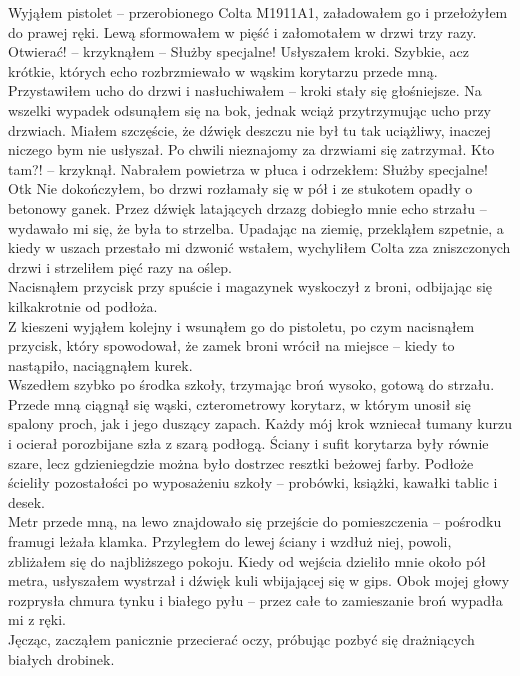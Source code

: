 \documentclass[../MAIN.tex]{subfiles}
\begin{document}
Wyjąłem pistolet -- przerobionego Colta M1911A1, załadowałem go i przełożyłem do prawej ręki. Lewą sformowałem w pięść i załomotałem w drzwi trzy razy.
%
\sx Otwierać! -- krzyknąłem -- Służby specjalne!
\qd
Usłyszałem kroki. Szybkie, acz krótkie, których echo rozbrzmiewało w wąskim korytarzu przede mną.
Przystawiłem ucho do drzwi i nasłuchiwałem -- kroki stały się głośniejsze. Na wszelki wypadek odsunąłem się na bok, jednak wciąż przytrzymując ucho przy drzwiach. Miałem szczęście, że dźwięk deszczu nie był tu tak uciążliwy, inaczej niczego bym nie usłyszał. Po chwili nieznajomy za drzwiami się zatrzymał.
%
\sx Kto tam?! -- krzyknął.
\qd
Nabrałem powietrza w płuca i odrzekłem:
%
\sx Służby specjalne! Ot\3k
\qd
Nie dokończyłem, bo drzwi rozłamały się w pół i ze stukotem opadły o betonowy ganek. Przez dźwięk latających drzazg dobiegło mnie echo strzału -- wydawało mi się, że była to strzelba. Upadając na ziemię, przekląłem szpetnie, a kiedy w uszach przestało mi dzwonić wstałem, wychyliłem Colta zza zniszczonych drzwi i strzeliłem pięć razy na oślep.\\
Nacisnąłem przycisk przy spuście i magazynek wyskoczył z broni, odbijając się kilkakrotnie od podłoża. \\
Z kieszeni wyjąłem kolejny i wsunąłem go do pistoletu, po czym nacisnąłem przycisk, który spowodował, że zamek broni wrócił na miejsce -- kiedy to nastąpiło, naciągnąłem kurek. \\
Wszedłem szybko po środka szkoły, trzymając broń wysoko, gotową do strzału. \\
Przede mną ciągnął się wąski, czterometrowy korytarz, w którym unosił się spalony proch, jak i jego duszący zapach. Każdy mój krok wzniecał tumany kurzu i ocierał porozbijane szła z szarą podłogą. Ściany i sufit korytarza były równie szare, lecz gdzieniegdzie można było dostrzec resztki beżowej farby. Podłoże ścieliły pozostałości po wyposażeniu szkoły -- probówki, książki, kawałki tablic i desek. \\
Metr przede mną, na lewo znajdowało się przejście do pomieszczenia -- pośrodku framugi leżała klamka. Przyległem do lewej ściany i wzdłuż niej, powoli, zbliżałem się do najbliższego pokoju. Kiedy od wejścia dzieliło mnie około pół metra, usłyszałem wystrzał i dźwięk kuli wbijającej się w gips. Obok mojej głowy rozprysła chmura tynku i białego pyłu -- przez całe to zamieszanie broń wypadła mi z ręki. \\
Jęcząc, zacząłem panicznie przecierać oczy, próbując pozbyć się drażniących białych drobinek.\\
\end{document}
